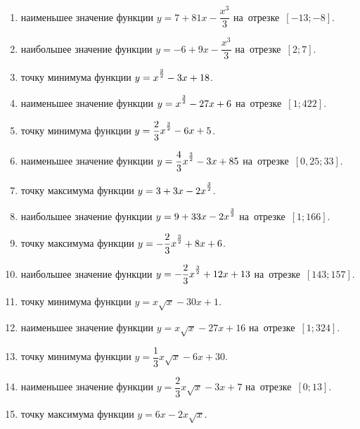 \documentclass[a4paper,10pt]{article}
\begin{document}
\begin{enumerate}
\item {} наименьшее значение функции $y=7 +81x-\dfrac{x^3}{3}$ на~отрезке~$\left[-13;-8\right]$.

\item {} наибольшее значение функции $y=-6 +9x-\dfrac{x^3}{3}$ на~отрезке~$\left[2;7\right]$.

\item {} точку минимума функции $y=x\strut^{\frac{3}{2}} -3x+18$.

\item {} наименьшее значение функции $y=x\strut^{\frac{3}{2}} -27x+6$ на~отрезке~$\left[1;422\right]$.

\item {} точку минимума функции $y=\dfrac{2}{3}x\strut^{\frac{3}{2}} -6x+5$.

\item {} наименьшее значение функции $y=\dfrac{4}{3}x\strut^{\frac{3}{2}} -3x+85$ на~отрезке~$\left[0,25;33\right]$.

\item {} точку максимума функции $y=3+3x-2x\strut^{\frac{3}{2}}$.

\item {} наибольшее значение функции $y=9+33x-2x\strut^{\frac{3}{2}}$ на~отрезке~$\left[1;166\right]$.

\item {} точку максимума функции $y=-\dfrac{2}{3}x\strut^{\frac{3}{2}} +8x+6$.

\item {} наибольшее значение функции $y=-\dfrac{2}{3}x\strut^{\frac{3}{2}} +12x+13$ на~отрезке~$\left[143;157\right]$.

\item {} точку минимума функции $y=x\sqrt{x} -30x+1$.

\item {} наименьшее значение функции $y=x\sqrt{x} -27x+16$ на~отрезке~$\left[1;324\right]$.

\item {} точку минимума функции $y=\dfrac{1}{3}x\sqrt{x} -6x+30$.

\item {} наименьшее значение функции $y=\dfrac{2}{3}x\sqrt{x} -3x+7$ на~отрезке~$\left[0;13\right]$.

\item {} точку максимума функции $y=6x -2x\sqrt{x}$.


\end{enumerate}
\end{document}
